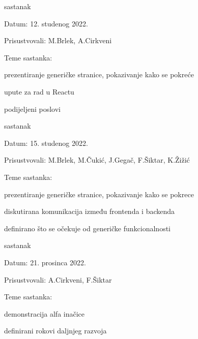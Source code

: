 \begin{packed_enum}
			\item  sastanak 
			\item[] \begin{packed_item}
				\item Datum: 12. studenog 2022.
				\item Prisustvovali: M.Brlek, A.Cirkveni
				\item Teme sastanka:
				\begin{packed_item}
					\item prezentiranje generičke stranice, pokazivanje kako se pokreće
					\item upute za rad u Reactu
					\item podijeljeni poslovi
				\end{packed_item}
			\end{packed_item}
		
			\item  sastanak 
			\item[] \begin{packed_item}
				\item Datum: 15. studenog 2022.
				\item Prisustvovali: M.Brlek, M.Čukić, J.Gegač, F.Šiktar, K.Žižić
				\item Teme sastanka:
				\begin{packed_item}
					\item prezentiranje generičke stranice, pokazivanje kako se pokrece
					\item diskutirana komunikacija između frontenda i backenda
					\item definirano što se očekuje od generičke funkcionalnosti
				\end{packed_item}
			\end{packed_item}
		
			\item  sastanak 
			\item[] \begin{packed_item}
				\item Datum: 21. prosinca 2022.
				\item Prisustvovali: A.Cirkveni, F.Šiktar
				\item Teme sastanka:
				\begin{packed_item}
					\item demonstracija alfa inačice
					\item definirani rokovi daljnjeg razvoja
				\end{packed_item}
			\end{packed_item}
		

\end{packed_enum}
